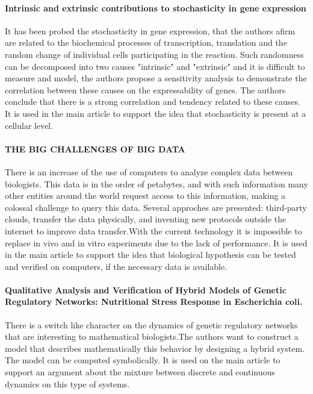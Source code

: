 \documentclass{article}
\begin{document}
\paragraph{Intrinsic and extrinsic contributions to stochasticity in gene expression\cite{peter_s._swain_intrinsic_2002}}

It has been probed the stochasticity in gene expression, that the authors afirm are related to the biochemical processes of transcription, translation and the random change of individual cells participating in the reaction. Such randomness can be decomposed into two causes "intrinsic" and "extrinsic" and it is difficult to measure and model, the authors propose a sensitivity analysis to demonstrate the correlation between these causes on the expressability of genes. The authors conclude that there is a strong correlation and tendency related to these causes. It is used in the main article to support the idea that stochasticity is present at a cellular level.

\paragraph{THE BIG CHALLENGES OF BIG DATA\cite{vivien_marx_big_2013}}

There is an increase of the use of computers to analyze complex data between biologists. This data is in the order of petabytes, and with such information many other entities around the world request access to this information, making a colossal challenge to query this data. Several approches are presented: third-party clouds, transfer the data physically, and inventing new protocols outside the internet to improve data transfer.With the current technology it is impossible to replace in vivo and in vitro experiments due to the lack of performance. It is used in the main article to support the idea that biological hypothesis can be tested and verified on computers, if the necessary data is available.

\paragraph{Qualitative Analysis and Verification of Hybrid Models of Genetic Regulatory Networks: Nutritional Stress Response in Escherichia coli\cite{gregory_batt_qualitative_2005}.}

There is a switch like character on the dynamics of genetic regulatory networks that are interesting to mathematical biologists.The authors want to construct a model that describes mathematically this behavior by designing a hybrid system. The model can be computed symbolically. It is used on the main article to support an argument about the mixture between discrete and continuous dynamics on this type of systems.
\end{document}
